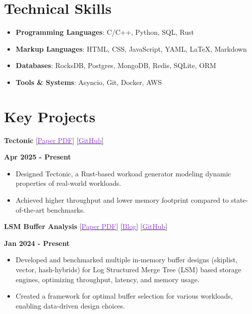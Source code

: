 \documentclass[11pt,a4paper,calibri]{moderncv}
\begin{document}
\vspace{-0.9em}
\section{Technical Skills}
\vspace{-0.3em}
\begin{itemize}[topsep=0pt, itemsep=0pt, parsep=0.2em]
	\item \textbf{Programming Languages}: C/C++, Python, SQL, Rust
	\item \textbf{Markup Languages}: HTML, CSS, JavaScript, YAML, \LaTeX, Markdown
	\item \textbf{Databases}: RocksDB, Postgres, MongoDB, Redis, SQLite, ORM
	\item \textbf{Tools \& Systems}: Asyncio, Git, Docker, AWS
\end{itemize}

\vspace{-1em}
\section{Key Projects}
\vspace{-0.3em}
\textbf{Tectonic} \href{https://shubhamkaushik.com/projects/assets/pdf/Tectonic.pdf}{[\textcolor{blueviolet}{Paper PDF}]} \href{https://github.com/SSD-Brandeis/tectonic}{[\textcolor{blueviolet}{GitHub}]} \hfill \raggedright{\textbf{Apr 2025 - Present}}
\begin{itemize}[left=4pt, topsep=0pt, itemsep=0pt, parsep=0.5pt]
    \item Designed Tectonic, a Rust-based workoad generator modeling dynamic properties of real-world workloads.
    \item Achieved \underbar{$2\times$} higher throughput and  lower memory footprint compared to state-of-the-art benchmarks.
\end{itemize}

\mediumspace{}

\textbf{LSM Buffer Analysis} \href{https://shubhamkaushik.com/assets/pdf/LSMMemory.pdf}{[\textcolor{blueviolet}{Paper PDF}]} \href{https://shubhamkaushik.com/projects/lsm_memory_buffer/}{[\textcolor{blueviolet}{Blog}]} \href{https://github.com/SSD-Brandeis/LSMMemoryProfiling}{[\textcolor{blueviolet}{GitHub}]} \hfill \raggedright{\textbf{Jan 2024 - Present}}
\begin{itemize}[left=4pt, topsep=0pt, itemsep=0pt, parsep=0.5pt]
    \item Developed and benchmarked multiple in-memory buffer designs (skiplist, vector, hash-hybrids) for Log Structured Merge Tree (LSM) based storage engines, optimizing throughput, latency, and memory usage.
    \item Created a framework for optimal buffer selection for various workloads, enabling data-driven design choices.
\end{itemize}
\end{document}
